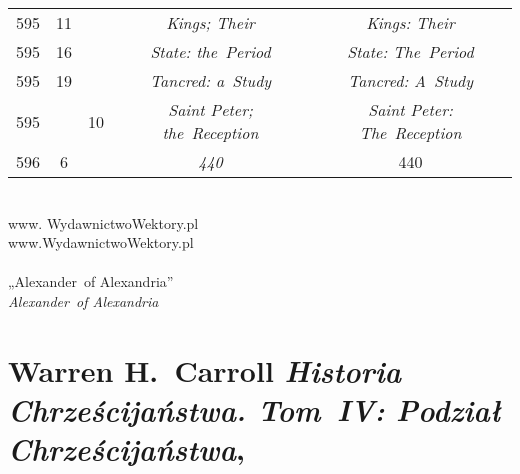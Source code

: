 \documentclass[a4paper,11pt]{article}
\numberwithin{equation}{section}
\begin{document}
\begin{center}
\begin{tabular}{|c|c|c|c|c|}
    595 & 11 & & \textit{Kings; Their} & \textit{Kings: Their} \\
    595 & 16 & & \textit{State: the~Period} & \textit{State: The~Period} \\
    595 & 19 & & \textit{Tancred: a~Study} & \textit{Tancred: A~Study} \\
    595 & & 10 & \textit{Saint Peter; the~Reception}
           & \textit{Saint Peter: The~Reception} \\
    596 & \hphantom{0}6 & & \textit{440} & 440 \\
    \hline
  \end{tabular}

\end{center}

\VerSpaceSix


\noindent
{} \\
\Jest www. WydawnictwoWektory.pl \\
\PowinnoByc www.WydawnictwoWektory.pl \\
 \\
\Jest „Alexander~of Alexandria” \\
\PowinnoByc \textit{Alexander~of Alexandria} \\













\section{Warren H.~Carroll \textit{Historia Chrześcijaństwa.
    Tom~IV: Podział Chrześcijaństwa},
  \cite{CarrollHistoriaChrzecijanstwaVolIV2011}}






\newpage

\end{document}
